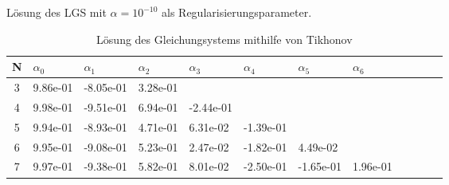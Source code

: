 \documentclass{beamer}
\begin{document}
    \begin{frame}
    Lösung des LGS mit $\alpha=10^{-10}$ als Regularisierungsparameter.
    \centering    
    \begin{table}[htbp]
    \tiny   
    \renewcommand{\arraystretch}{1.5}
    \begin{tabularx}{\textwidth}{|c|X|X|X|X|X|X|X|X|X|X|X|}
        \hline    
        N & $\alpha_0$&$\alpha_1$&$\alpha_2$&$\alpha_3$&$\alpha_4$&$\alpha_5$&$\alpha_6$ \\\hline
        3 &9.86e-01  &-8.05e-01  &3.28e-01 &&&& \\\hline
        4 &9.98e-01  &-9.51e-01  &6.94e-01  &-2.44e-01 &&& \\\hline
        5 &9.94e-01  &-8.93e-01  &4.71e-01  &6.31e-02  &-1.39e-01 && \\\hline
        6 &9.95e-01  &-9.08e-01  &5.23e-01  &2.47e-02  &-1.82e-01  &4.49e-02 & \\\hline
        7 &9.97e-01  &-9.38e-01  &5.82e-01  &8.01e-02  &-2.50e-01  &-1.65e-01  &1.96e-01  \\\hline
        \end{tabularx}
    \caption{Lösung des Gleichungsystems mithilfe von Tikhonov}      
    \end{table}
  \end{frame}
\end{document}
